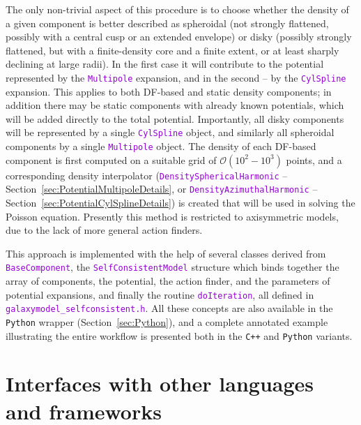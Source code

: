 \documentclass[12pt]{article}
\newcommand{\Cpp}  {\texttt{C++}\xspace}
\newcommand{\Python}{\texttt{Python}\xspace}
\newcommand{\ttt}[1]{\textcolor{darkviolet}{\texttt{#1}}}
\begin{document}
The only non-trivial aspect of this procedure is to choose whether the density of a given component is better described as spheroidal (not strongly flattened, possibly with a central cusp or an extended envelope) or disky (possibly strongly flattened, but with a finite-density core and a finite extent, or at least sharply declining at large radii). In the first case it will contribute to the potential represented by the \ttt{Multipole} expansion, and in the second -- by the \ttt{CylSpline} expansion. This applies to both DF-based and static density components; in addition there may be static components with already known potentials, which will be added directly to the total potential. Importantly, all disky components will be represented by a single \ttt{CylSpline} object, and similarly all spheroidal components by a single \ttt{Multipole} object.
The density of each DF-based component is first computed on a suitable grid of $\mathcal{O}(10^2-10^3)$ points, and a corresponding density interpolator (\ttt{DensitySphericalHarmonic} -- Section~\ref{sec:PotentialMultipoleDetails}, or \ttt{DensityAzimuthalHarmonic} -- Section~\ref{sec:PotentialCylSplineDetails}) is created that will be used in solving the Poisson equation. 
Presently this method is restricted to axisymmetric models, due to the lack of more general action finders.

This approach is implemented with the help of several classes derived from \ttt{BaseComponent}, the \ttt{SelfConsistentModel} structure which binds together the array of components, the potential, the action finder, and the parameters of potential expansions, and finally the routine \ttt{doIteration}, all defined in \ttt{galaxymodel_selfconsistent.h}. All these concepts are also available in the \Python wrapper (Section~\ref{sec:Python}), and a complete annotated example illustrating the entire workflow is presented both in the \Cpp and \Python variants.


\section{Interfaces with other languages and frameworks}  \label{sec:Interfaces}
\end{document}
